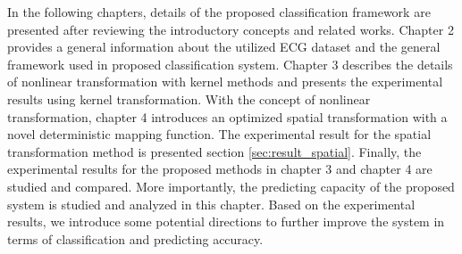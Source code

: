 In the following chapters, details of the proposed classification framework are presented after reviewing the introductory concepts and related works. Chapter 2 provides a general information about the utilized ECG dataset and the general framework used in proposed classification system. Chapter 3 describes the details of nonlinear transformation with kernel methods and presents the experimental results using kernel transformation. With the concept of nonlinear transformation, chapter 4 introduces an optimized spatial transformation with a novel deterministic mapping function. The experimental result for the spatial transformation method is presented section \ref{sec:result_spatial}. Finally, the experimental results for the proposed methods in chapter 3 and chapter 4 are studied and compared. More importantly, the predicting capacity of the proposed system is studied and analyzed in this chapter. Based on the experimental results, we introduce some potential directions to further improve the system in terms of classification and predicting accuracy.
